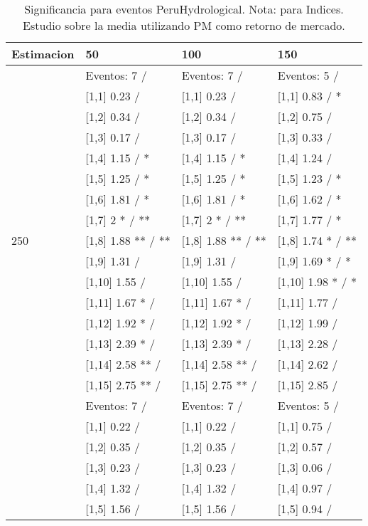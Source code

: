 \begin{table}

\caption{Significancia para eventos PeruHydrological. Nota: para Indices. Estudio sobre la media utilizando PM como retorno de mercado.}
\centering
\begin{tabular}[t]{llll}
\toprule
Estimacion & 50 & 100 & 150\\
\midrule
 & Eventos:  7 / & Eventos:  7 / & Eventos:  5 /\\
 & {}[1,1] 0.23  / & {}[1,1] 0.23  / & {}[1,1] 0.83  / *\\
 & {}[1,2] 0.34  / & {}[1,2] 0.34  / & {}[1,2] 0.75  /\\
 & {}[1,3] 0.17  / & {}[1,3] 0.17  / & {}[1,3] 0.33  /\\
 & {}[1,4] 1.15  / * & {}[1,4] 1.15  / * & {}[1,4] 1.24  /\\
\addlinespace
 & {}[1,5] 1.25  / * & {}[1,5] 1.25  / * & {}[1,5] 1.23  / *\\
 & {}[1,6] 1.81  / * & {}[1,6] 1.81  / * & {}[1,6] 1.62  / *\\
 & {}[1,7] 2 * / ** & {}[1,7] 2 * / ** & {}[1,7] 1.77  / *\\
250 & {}[1,8] 1.88 ** / ** & {}[1,8] 1.88 ** / ** & {}[1,8] 1.74 * / **\\
 & {}[1,9] 1.31  / & {}[1,9] 1.31  / & {}[1,9] 1.69 * / *\\
\addlinespace
 & {}[1,10] 1.55  / & {}[1,10] 1.55  / & {}[1,10] 1.98 * / *\\
 & {}[1,11] 1.67 * / & {}[1,11] 1.67 * / & {}[1,11] 1.77  /\\
 & {}[1,12] 1.92 * / & {}[1,12] 1.92 * / & {}[1,12] 1.99  /\\
 & {}[1,13] 2.39 * / & {}[1,13] 2.39 * / & {}[1,13] 2.28  /\\
 & {}[1,14] 2.58 ** / & {}[1,14] 2.58 ** / & {}[1,14] 2.62  /\\
\addlinespace
 & {}[1,15] 2.75 ** / & {}[1,15] 2.75 ** / & {}[1,15] 2.85  /\\
 & Eventos:  7 / & Eventos:  7 / & Eventos:  5 /\\
 & {}[1,1] 0.22  / & {}[1,1] 0.22  / & {}[1,1] 0.75  /\\
 & {}[1,2] 0.35  / & {}[1,2] 0.35  / & {}[1,2] 0.57  /\\
 & {}[1,3] 0.23  / & {}[1,3] 0.23  / & {}[1,3] 0.06  /\\
\addlinespace
 & {}[1,4] 1.32  / & {}[1,4] 1.32  / & {}[1,4] 0.97  /\\
 & {}[1,5] 1.56  / & {}[1,5] 1.56  / & {}[1,5] 0.94  /\\

\end{tabular}
\end{table}

